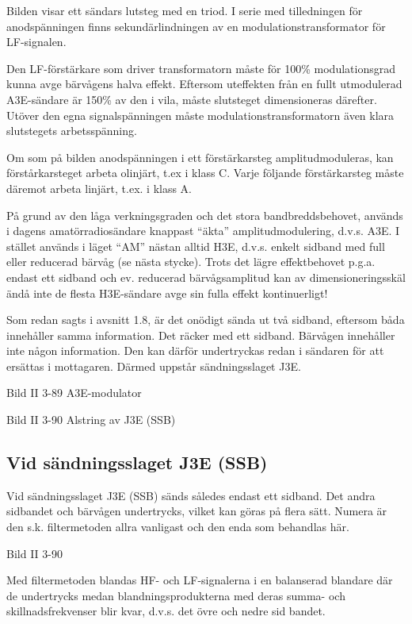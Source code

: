 Bilden visar ett sändars lutsteg med en triod.  I serie med
tilledningen för anodspänningen finns sekundärlindningen av en
modulationstransformator för LF-signalen.

Den LF-förstärkare som driver transformatorn måste för 100\%
modulationsgrad kunna avge bärvågens halva effekt. Eftersom uteffekten
från en fullt utmodulerad A3E-sändare är 150\% av den i vila, måste
slutsteget dimensioneras därefter. Utöver den egna signalspänningen
måste modulationstransformatorn även klara slutstegets arbetsspänning.

Om som på bilden anodspänningen i ett förstärkarsteg
amplitudmoduleras, kan förstårkarsteget arbeta olinjärt, t.ex i klass
C.  Varje följande förstärkarsteg måste däremot arbeta linjärt,
t.ex. i klass A.

På grund av den låga verkningsgraden och det stora bandbreddsbehovet,
används i dagens amatörradiosändare knappast ``äkta''
amplitudmodulering, d.v.s. A3E. I stället används i läget ``AM'' nästan
alltid H3E, d.v.s. enkelt sidband med full eller reducerad bärvåg (se
nästa stycke). Trots det lägre effektbehovet p.g.a. endast ett sidband
och ev. reducerad bärvågsamplitud kan av dimensioneringsskäl ändå inte
de flesta H3E-sändare avge sin fulla effekt kontinuerligt!

Som redan sagts i avsnitt 1.8, är det onödigt sända ut två sidband,
eftersom båda innehåller samma information. Det räcker med ett
sidband. Bärvågen innehåller inte någon information. Den kan därför
undertryckas redan i sändaren för att ersättas i mottagaren. Därmed
uppstår sändningsslaget J3E.

Bild II 3-89 A3E-modulator

Bild II 3-90 Alstring av J3E (SSB)

\subsection{Vid sändningsslaget J3E (SSB)}

Vid sändningsslaget J3E (SSB) sänds således endast ett sidband. Det
andra sidbandet och bärvågen undertrycks, vilket kan göras på flera
sätt. Numera är den s.k. filtermetoden allra vanligast och den enda
som behandlas här.

Bild II 3-90

Med filtermetoden blandas HF- och LF-signalerna i en balanserad
blandare där de undertrycks medan blandningsprodukterna med deras
summa- och skillnadsfrekvenser blir kvar, d.v.s. det övre och nedre
sid bandet.

